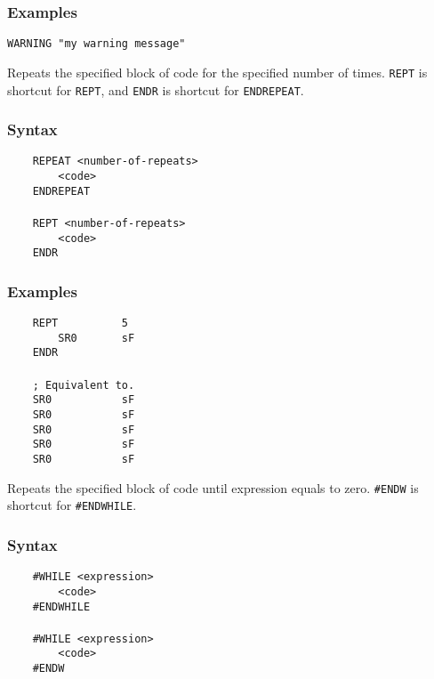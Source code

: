         \subsubsection{Examples}
            \verb'WARNING "my warning message"'

    \clearpage
        Repeats the specified block of code for the specified number of times. \texttt{REPT} is shortcut for \texttt{REPT}, and \texttt{ENDR} is shortcut for \texttt{ENDREPEAT}.

        \subsubsection{Syntax}
            \verb'    REPEAT <number-of-repeats>'\\
            \verb'        <code>'\\
            \verb'    ENDREPEAT'\\
            \verb''\\
            \verb'    REPT <number-of-repeats>'\\
            \verb'        <code>'\\
            \verb'    ENDR'

        \subsubsection{Examples}
            \verb'    REPT          5'\\
            \verb'        SR0       sF'\\
            \verb'    ENDR'\\
            \verb''\\
            \verb'    ; Equivalent to.'\\
            \verb'    SR0           sF'\\
            \verb'    SR0           sF'\\
            \verb'    SR0           sF'\\
            \verb'    SR0           sF'\\
            \verb'    SR0           sF'

    \clearpage
        Repeats the specified block of code until expression equals to zero. \texttt{\#ENDW} is shortcut for \texttt{\#ENDWHILE}.

        \subsubsection{Syntax}
            \verb'    #WHILE <expression>'\\
            \verb'        <code>'\\
            \verb'    #ENDWHILE'\\
            \verb''\\
            \verb'    #WHILE <expression>'\\
            \verb'        <code>'\\
            \verb'    #ENDW'

